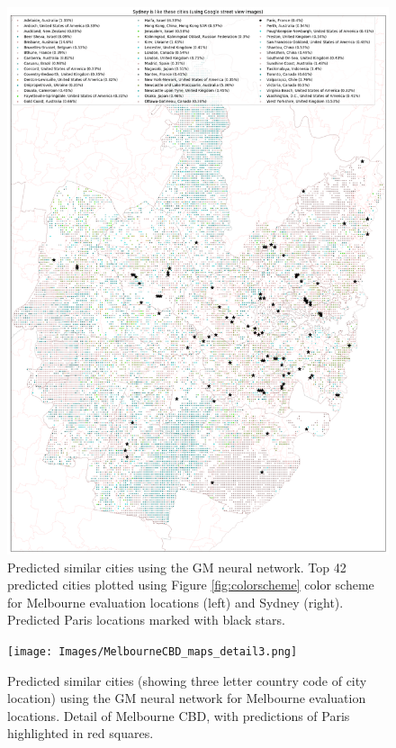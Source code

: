 \documentclass[sageh,times]{sagej}
\begin{document}
\begin{figure}[!htbp]
\includegraphics[scale=0.15]{Images/SydneyOverallAbrev_maps.png}  
\caption{Predicted similar cities using the GM neural network. Top 42 predicted cities plotted using Figure \ref{fig:colorscheme} color scheme for Melbourne evaluation locations (left) and Sydney (right). Predicted Paris locations marked with black stars.}    
 \label{fig:melmaps}  
\end{figure} 

\begin{figure}[!htbp]
\centering     
\texttt{[image: Images/MelbourneCBD\_maps\_detail3.png]} 
\caption{Predicted similar cities (showing three letter country code of city location) using the GM neural network for Melbourne evaluation locations. Detail of Melbourne CBD, with predictions of Paris highlighted in red squares.}    
 \label{fig:melmapscbd}  
\end{figure} 
\end{document}
